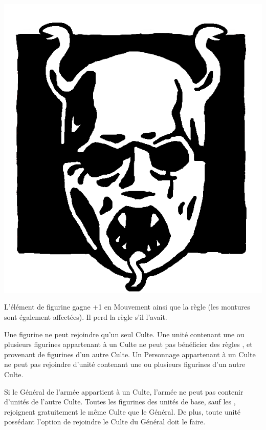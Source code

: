 \begin{multicols}{2}
\begin{center}
\includegraphics[width=\logosize]{pics/cultofyema.png}
\armyspecialruleentry{\cultofyema}

L'élément de figurine gagne +1 en Mouvement ainsi que la règle \strider{} (les montures sont également affectées). Il perd la règle \killerinstinct{} s'il l'avait.
\end{center}
\end{multicols}

\armyspecialruleentry{\cultrivalry}

Une figurine ne peut rejoindre qu'un seul Culte. Une unité contenant une ou plusieurs figurines appartenant à un Culte ne peut pas bénéficier des règles \holdyourground{}, \inspiringpresence{} et \divineblessings{} provenant de figurines d'un autre Culte. Un Personnage appartenant à un Culte ne peut pas rejoindre d'unité contenant une ou plusieurs figurines d'un autre Culte.

\armyspecialruleentry{\cultistgeneral}

Si le Général de l'armée appartient à un Culte, l'armée ne peut pas contenir d'unités de l'autre Culte. Toutes les figurines des unités de base, sauf les \bladesofnabh{}, rejoignent gratuitement le même Culte que le Général. De plus, toute unité possédant l'option de rejoindre le Culte du Général doit le faire.

